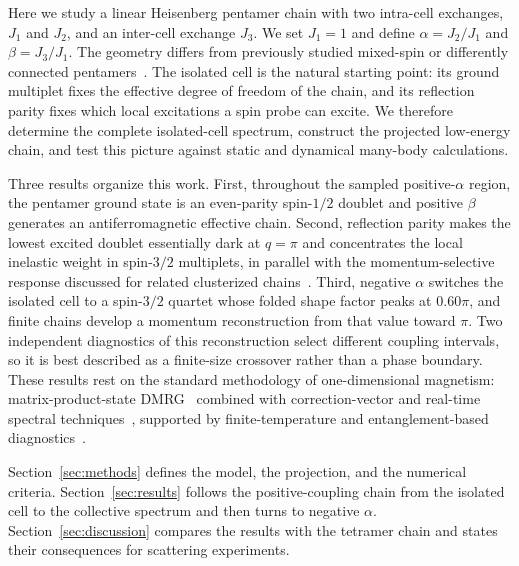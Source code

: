 Here we study a linear Heisenberg pentamer chain with two intra-cell exchanges,
$J_1$ and $J_2$, and an inter-cell exchange $J_3$.
We set $J_1=1$ and define $\alpha=J_2/J_1$ and $\beta=J_3/J_1$.
The geometry differs from previously studied mixed-spin or differently connected
pentamers~\cite{haraldsen2011pentamer}.
The isolated cell is the natural starting point: its ground multiplet fixes the
effective degree of freedom of the chain, and its reflection parity fixes which
local excitations a spin probe can excite.
We therefore determine the complete isolated-cell spectrum, construct the
projected low-energy chain, and test this picture against static and dynamical
many-body calculations.

Three results organize this work.
First, throughout the sampled positive-$\alpha$ region, the pentamer ground
state is an even-parity spin-$1/2$ doublet and positive $\beta$ generates an
antiferromagnetic effective chain.
Second, reflection parity makes the lowest excited doublet essentially dark at
$q=\pi$ and concentrates the local inelastic weight in spin-$3/2$ multiplets, in
parallel with the momentum-selective response discussed for related clusterized
chains~\cite{gao2024srv3o9,schlappa2018,ishii2025kedge}.
Third, negative $\alpha$ switches the isolated cell to a spin-$3/2$ quartet whose
folded shape factor peaks at $0.60\pi$, and finite chains develop a momentum
reconstruction from that value toward $\pi$.
Two independent diagnostics of this reconstruction select different coupling
intervals, so it is best described as a finite-size crossover rather than a phase
boundary.
These results rest on the standard methodology of one-dimensional magnetism: matrix-product-state
DMRG~\cite{white1992,schollwoeck2005,schollwoeck2011} combined with
correction-vector and real-time spectral
techniques~\cite{kuehner1999,jeckelmann2002,vidal2004,paeckel2019}, supported by
finite-temperature and entanglement-based
diagnostics~\cite{barthel2009,fishman2022,keselman2020}.

Section~\ref{sec:methods} defines the model, the projection, and the numerical
criteria.
Section~\ref{sec:results} follows the positive-coupling chain from the isolated
cell to the collective spectrum and then turns to negative $\alpha$.
Section~\ref{sec:discussion} compares the results with the tetramer chain and
states their consequences for scattering experiments.
